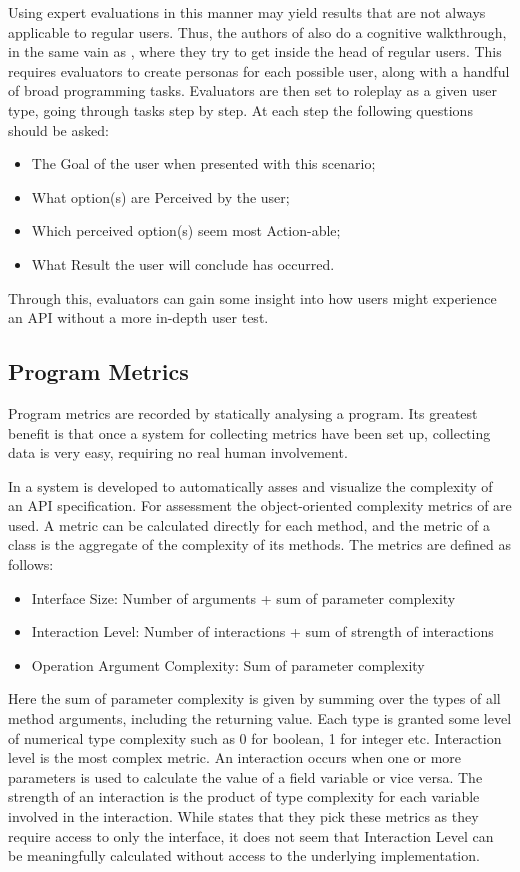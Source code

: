 Using expert evaluations in this manner may yield results that are not always applicable to regular users.
Thus, the authors of \cite{beaton2008usability} also do a cognitive walkthrough, in the same vain as \citet{o2010api}, where they try to get inside the head of regular users. 
This requires evaluators to create personas for each possible user, along with a handful of broad programming tasks.
Evaluators are then set to roleplay as a given user type, going through tasks step by step. 
At each step the following questions should be asked: 
\begin{itemize}
\item The Goal of the user when presented with this scenario;
\item  What option(s) are Perceived by the user;
\item Which perceived option(s) seem most Action-able;
\item What Result the user will conclude has occurred.
\end{itemize}
Through this, evaluators can gain some insight into how users might experience an \gls{API} without a more in-depth user test.

\subsection{Program Metrics}
Program metrics are recorded by statically analysing a program.
Its greatest benefit is that once a system for collecting metrics have been set up, collecting data is very easy, requiring no real human involvement. 

In \cite{de2009automatic} a system is developed to automatically asses and visualize the complexity of an \gls{API} specification.
For assessment the object-oriented complexity metrics of \citet{bandi2003predicting} are used. 
A metric can be calculated directly for each method, and the metric of a class is the aggregate of the complexity of its methods. 
The metrics are defined as follows:

\begin{itemize}
\item  Interface Size: Number of arguments + sum of parameter complexity
\item Interaction Level: Number of interactions + sum of strength of interactions
\item Operation Argument Complexity: Sum of parameter complexity
\end{itemize} 

Here the sum of parameter complexity is given by summing over the types of all method arguments, including the returning value.
Each type is granted some level of numerical type complexity such as 0 for boolean, 1 for integer etc.
Interaction level is the most complex metric.
An interaction occurs when one or more parameters is used to calculate the value of a field variable or vice versa.
The strength of an interaction is the product of type complexity for each variable involved in the interaction.
While \citet{de2009automatic} states that they pick these metrics as they require access to only the interface, it does not seem that Interaction Level can be meaningfully calculated without access to the underlying implementation. 

